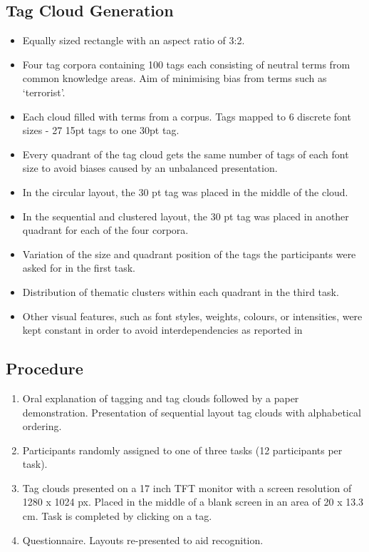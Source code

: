 \subsection{Tag Cloud Generation}
\begin{itemize}
	\item Equally sized rectangle with an aspect ratio of 3:2.
	\item Four tag corpora containing 100 tags each consisting of neutral terms from common knowledge areas. Aim of minimising bias from terms such as `terrorist'. 
	\item Each cloud filled with terms from a corpus. Tags mapped to 6 discrete font sizes - 27 15pt tags to one 30pt tag.
	\item Every quadrant of the tag cloud gets the same number of tags of each font size to avoid biases caused by an unbalanced presentation.
	\item In the circular layout, the 30 pt tag was placed in the middle of the cloud.
	\item In the sequential and clustered layout, the 30 pt tag was placed in another quadrant for each of the four corpora.
	\item Variation of the size and quadrant position of the tags the participants were asked for in the first task.
	\item Distribution of thematic clusters within each quadrant in the third task.
	\item Other visual features, such as font styles, weights, colours, or intensities, were kept constant in order to avoid interdependencies as reported in \cite{bateman08}
\end{itemize}

\subsection{Procedure}

\begin{enumerate}
	\item Oral explanation of tagging and tag clouds followed by a paper demonstration. Presentation of sequential layout tag clouds with alphabetical ordering.
	\item Participants randomly assigned to one of three tasks (12 participants per task).
	\item Tag clouds presented on a 17 inch TFT monitor with a screen resolution of 1280 x 1024 px. Placed in the middle of a blank screen in an area of 20 x 13.3 cm. Task is completed by clicking on a tag.
	\item Questionnaire. Layouts re-presented to aid recognition.
\end{enumerate}

